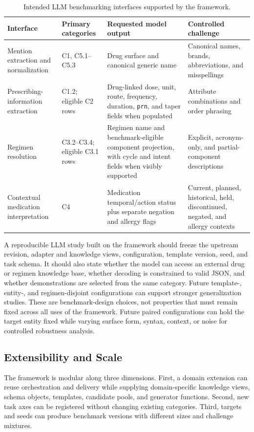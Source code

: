 \documentclass[conference]{IEEEtran}
\newcommand{\code}[1]{\texttt{#1}}
\begin{document}
\begin{table}[t]
\caption{Intended LLM benchmarking interfaces supported by the framework.}
\label{tab:llm-tasks}
\centering
\footnotesize
\begin{tabularx}{\textwidth}{@{}l l Y Y@{}}
\toprule
\textbf{Interface} & \textbf{Primary categories} &
\textbf{Requested model output} & \textbf{Controlled challenge} \\
\midrule
Mention extraction and normalization & C1, C5.1--C5.3 &
Drug surface and canonical generic name &
Canonical names, brands, abbreviations, and misspellings \\
Prescribing-information extraction & C1.2; eligible C2 rows &
Drug-linked dose, unit, route, frequency, duration, \code{prn}, and taper fields when populated &
Attribute combinations and order phrasing \\
Regimen resolution & C3.2--C3.4; eligible C3.1 rows &
Regimen name and benchmark-eligible component projection, with cycle and intent fields when visibly supported &
Explicit, acronym-only, and partial-component descriptions \\
Contextual medication interpretation & C4 &
Medication temporal/action status plus separate negation and allergy flags &
Current, planned, historical, held, discontinued, negated, and allergy contexts \\
\bottomrule
\end{tabularx}
\end{table}

A reproducible LLM study built on the framework should freeze the upstream
revision, adapter and knowledge views, configuration, template version, seed,
and task schema. It should also
state whether the model can access an external drug or regimen knowledge base,
whether decoding is constrained to valid JSON, and whether demonstrations are
selected from the same category. Future template-, entity-, and
regimen-disjoint configurations can support stronger generalization studies.
These are benchmark-design choices, not properties that must remain fixed
across all uses of the framework. Future paired configurations can hold the
target entity fixed while varying surface form, syntax, context, or noise for
controlled robustness analysis.

\subsection{Extensibility and Scale}

The framework is modular along three dimensions. First, a domain extension can
reuse orchestration and delivery while supplying domain-specific knowledge
views, schema objects, templates, candidate pools, and generator functions.
Second, new task axes can be registered without changing existing categories.
Third, targets and seeds can produce benchmark versions with different sizes
and challenge mixtures.
\end{document}
